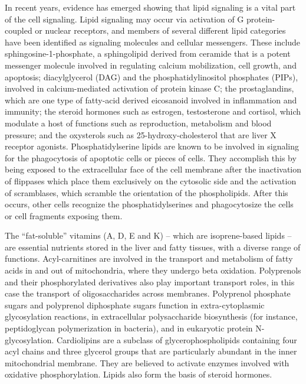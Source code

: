 In recent years, evidence has emerged showing that lipid signaling is a vital part of the cell signaling. Lipid signaling may occur via activation of G protein-coupled or nuclear receptors, and members of several different lipid categories have been identified as signaling molecules and cellular messengers. These include sphingosine-1-phosphate, a sphingolipid derived from ceramide that is a potent messenger molecule involved in regulating calcium mobilization, cell growth, and apoptosis; diacylglycerol (DAG) and the phosphatidylinositol phosphates (PIPs), involved in calcium-mediated activation of protein kinase C; the prostaglandins, which are one type of fatty-acid derived eicosanoid involved in inflammation and immunity; the steroid hormones such as estrogen, testosterone and cortisol, which modulate a host of functions such as reproduction, metabolism and blood pressure; and the oxysterols such as 25-hydroxy-cholesterol that are liver X receptor agonists. Phosphatidylserine lipids are known to be involved in signaling for the phagocytosis of apoptotic cells or pieces of cells. They accomplish this by being exposed to the extracellular face of the cell membrane after the inactivation of flippases which place them exclusively on the cytosolic side and the activation of scramblases, which scramble the orientation of the phospholipids. After this occurs, other cells recognize the phosphatidylserines and phagocytosize the cells or cell fragments exposing them.

The ``fat-soluble'' vitamins (A, D, E and K) -- which are isoprene-based lipids -- are essential nutrients stored in the liver and fatty tissues, with a diverse range of functions. Acyl-carnitines are involved in the transport and metabolism of fatty acids in and out of mitochondria, where they undergo beta oxidation. Polyprenols and their phosphorylated derivatives also play important transport roles, in this case the transport of oligosaccharides across membranes. Polyprenol phosphate sugars and polyprenol diphosphate sugars function in extra-cytoplasmic glycosylation reactions, in extracellular polysaccharide biosynthesis (for instance, peptidoglycan polymerization in bacteria), and in eukaryotic protein N-glycosylation. Cardiolipins are a subclass of glycerophospholipids containing four acyl chains and three glycerol groups that are particularly abundant in the inner mitochondrial membrane. They are believed to activate enzymes involved with oxidative phosphorylation. Lipids also form the basis of steroid hormones.

